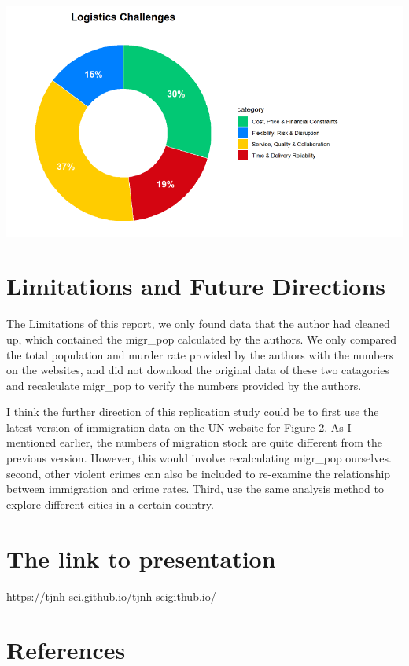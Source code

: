 \documentclass[
  man,
  floatsintext,
  longtable,
  nolmodern,
  notxfonts,
  notimes,
  colorlinks=true,linkcolor=blue,citecolor=blue,urlcolor=blue]{apa7}
\begin{document}
\begin{center}
\includegraphics[width=0.8\linewidth,height=\textheight,keepaspectratio]{fig/dhl.png}
\end{center}

\section{Limitations and Future
Directions}\label{limitations-and-future-directions}

The Limitations of this report, we only found data that the author had
cleaned up, which contained the migr\_pop calculated by the authors. We
only compared the total population and murder rate provided by the
authors with the numbers on the websites, and did not download the
original data of these two catagories and recalculate migr\_pop to
verify the numbers provided by the authors.

I think the further direction of this replication study could be to
first use the latest version of immigration data on the UN website for
Figure 2. As I mentioned earlier, the numbers of migration stock are
quite different from the previous version. However, this would involve
recalculating migr\_pop ourselves. second, other violent crimes can also
be included to re-examine the relationship between immigration and crime
rates. Third, use the same analysis method to explore different cities
in a certain country.

\section{The link to presentation}\label{the-link-to-presentation}

\url{https://tjnh-sci.github.io/tjnh-scigithub.io/}

\section{References}\label{references}
\end{document}

